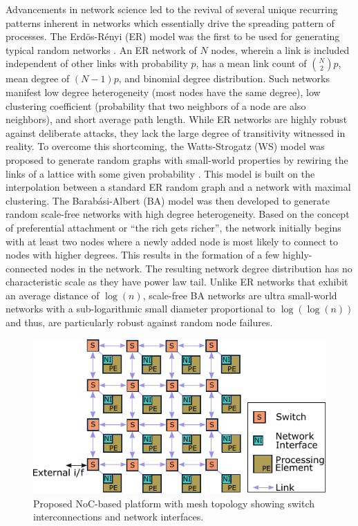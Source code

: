 Advancements in network science led to the revival of several unique recurring patterns inherent in networks which essentially drive the spreading pattern of processes. The Erd\"{o}s-R\'{e}nyi (ER) model was the first to be used for generating typical random networks \cite{Erdos60onthe}. 
An ER network of $N$ nodes, wherein a link is included independent of other links with probability $p$, has a mean link count of $\binom{N}{2} p$, mean degree of $(N-1)p$, and binomial degree distribution. Such networks manifest low degree heterogeneity (most nodes have the same degree), low clustering coefficient (probability that two neighbors of a node are also neighbors), and short average path length.
While ER networks are highly robust against deliberate attacks, they lack the large degree of transitivity witnessed in reality. To overcome this shortcoming, the Watts-Strogatz (WS) model was proposed to generate random graphs with small-world properties by rewiring the links of a lattice with some given probability \cite{barabasi2016network}.
This model is built on the interpolation between a standard ER random graph and a network with maximal clustering.
The Barab\'{a}si-Albert (BA) model was then developed to generate random scale-free networks with high degree heterogeneity. Based on the concept of preferential attachment or ``the rich gets richer'', the network initially begins with at least two nodes where a newly added node is most likely to connect to nodes with higher degrees. This results in the formation of a few highly-connected nodes in the network. The resulting network degree distribution has no characteristic scale as they have power law tail. Unlike ER networks that exhibit an average distance of $\log(n)$, scale-free BA networks are ultra small-world networks with a sub-logarithmic small diameter proportional to $\log(\log(n))$ and thus, are particularly robust against random node failures.

\begin{figure}[!t]
    \begin{center}
    \includegraphics[width=0.6\columnwidth]{Figures/noc.pdf}
    \caption{Proposed NoC-based platform with mesh topology showing switch interconnections and network interfaces.} 
    \label{figure:noc}
    \end{center}
    \vspace{-8mm}
\end{figure}


